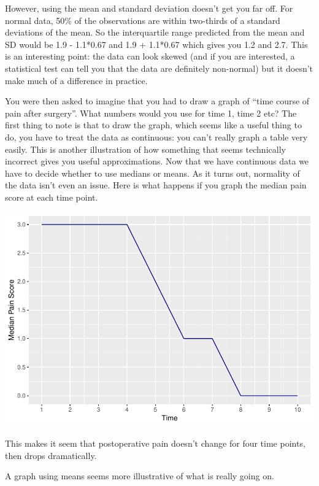 \documentclass[]{book}
\begin{document}
However, using the mean and standard deviation doesn't get you far off. For normal data, 50\% of the observations are within two-thirds of a standard deviations of the mean. So the interquartile range predicted from the mean and SD would be 1.9 - 1.1*0.67 and 1.9 + 1.1*0.67 which gives you 1.2 and 2.7. This is an interesting point: the data can look skewed (and if you are interested, a statistical test can tell you that the data are definitely non-normal) but it doesn't make much of a difference in practice.

You were then asked to imagine that you had to draw a graph of ``time course of pain after surgery''. What numbers would you use for time 1, time 2 etc? The first thing to note is that to draw the graph, which seems like a useful thing to do, you have to treat the data as continuous: you can't really graph a table very easily. This is another illustration of how something that seems technically incorrect gives you useful approximations. Now that we have continuous data we have to decide whether to use medians or means. As it turns out, normality of the data isn't even an issue. Here is what happens if you graph the median pain score at each time point.

\includegraphics{09-answers_files/figure-latex/week2e-1.pdf}

This makes it seem that postoperative pain doesn't change for four time points, then drops dramatically.

A graph using means seems more illustrative of what is really going on.
\end{document}
